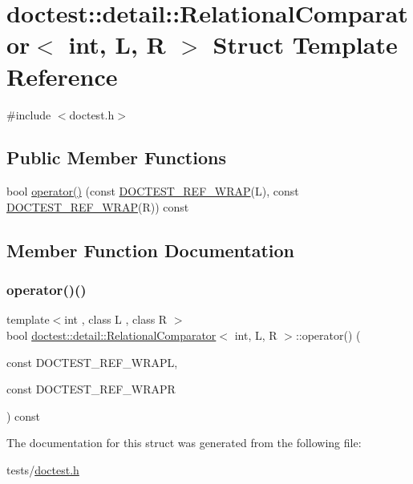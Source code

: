 \hypertarget{structdoctest_1_1detail_1_1RelationalComparator}{}\section{doctest\+:\+:detail\+:\+:Relational\+Comparator$<$ int, L, R $>$ Struct Template Reference}
\label{structdoctest_1_1detail_1_1RelationalComparator}


{\ttfamily \#include $<$doctest.\+h$>$}

\subsection*{Public Member Functions}
\begin{DoxyCompactItemize}
\item 
bool \hyperlink{structdoctest_1_1detail_1_1RelationalComparator_a51062ad46cd23c982838a0a51df70512}{operator()} (const \hyperlink{doctest_8h_af2901cafb023c57fb672ccb1bf14f2eb}{D\+O\+C\+T\+E\+S\+T\+\_\+\+R\+E\+F\+\_\+\+W\+R\+AP}(L), const \hyperlink{doctest_8h_af2901cafb023c57fb672ccb1bf14f2eb}{D\+O\+C\+T\+E\+S\+T\+\_\+\+R\+E\+F\+\_\+\+W\+R\+AP}(R)) const
\end{DoxyCompactItemize}


\subsection{Member Function Documentation}
\mbox{\label{structdoctest_1_1detail_1_1RelationalComparator_a51062ad46cd23c982838a0a51df70512}} 
\subsubsection{\texorpdfstring{operator()()}{operator()()}}
{\footnotesize\ttfamily template$<$int , class L , class R $>$ \\
bool \hyperlink{structdoctest_1_1detail_1_1RelationalComparator}{doctest\+::detail\+::\+Relational\+Comparator}$<$ int, L, R $>$\+::operator() (\begin{DoxyParamCaption}\item[{const }]{D\+O\+C\+T\+E\+S\+T\+\_\+\+R\+E\+F\+\_\+\+W\+R\+APL,  }\item[{const }]{D\+O\+C\+T\+E\+S\+T\+\_\+\+R\+E\+F\+\_\+\+W\+R\+APR }\end{DoxyParamCaption}) const\hspace{0.3cm}{\ttfamily [inline]}}



The documentation for this struct was generated from the following file\+:\begin{DoxyCompactItemize}
\item 
tests/\hyperlink{doctest_8h}{doctest.\+h}\end{DoxyCompactItemize}
